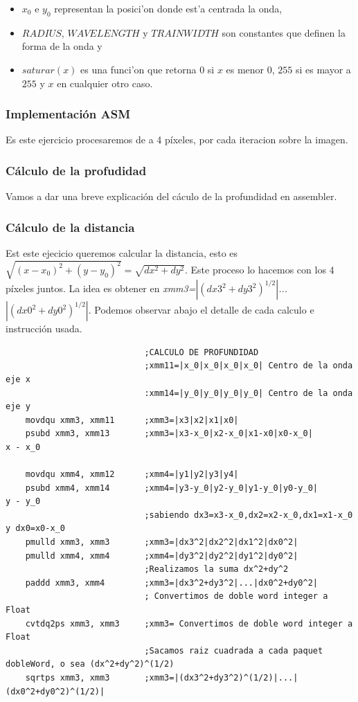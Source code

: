\begin{itemize}
  \item $x_0$ e $y_0$ representan la posici'on donde est'a centrada la onda,
  \item $RADIUS$, $WAVELENGTH$ y $TRAINWIDTH$ son constantes que definen la 
  forma de la onda y
  \item $saturar(x)$ es una funci'on que retorna $0$ si $x$ es menor $0$, $255$
  si es mayor a $255$ y $x$ en cualquier otro caso.
\end{itemize}

\newpage
\subsubsection{Implementación ASM}
Es este ejercicio procesaremos de a 4 píxeles, por cada iteracion sobre la imagen.
\subsubsection*{Cálculo de la profudidad}
Vamos a dar una breve explicación del cáculo de la profundidad en assembler.

\subsubsection*{Cálculo de la distancia}

Est este ejecicio queremos calcular la distancia, esto es $\sqrt{(x-x_0)^2+(y-y_0)^2} = \sqrt{dx^2+dy^2}$.
Este proceso lo hacemos con los 4 píxeles juntos.
La idea es obtener en \emph{xmm3=$|(dx3^2+dy3^2)^{1/2}|$...$|(dx0^2+dy0^2)^{1/2}|$}. Podemos observar abajo el detalle de cada calculo e instrucción usada.
\begin{codesnippet}
\begin{verbatim}
                            ;CALCULO DE PROFUNDIDAD
                            ;xmm11=|x_0|x_0|x_0|x_0| Centro de la onda eje x
                            :xmm14=|y_0|y_0|y_0|y_0| Centro de la onda eje y
    movdqu xmm3, xmm11      ;xmm3=|x3|x2|x1|x0| 
    psubd xmm3, xmm13       ;xmm3=|x3-x_0|x2-x_0|x1-x0|x0-x_0|                    x - x_0
							
    movdqu xmm4, xmm12      ;xmm4=|y1|y2|y3|y4|
    psubd xmm4, xmm14       ;xmm4=|y3-y_0|y2-y_0|y1-y_0|y0-y_0|                     y - y_0	
                            ;sabiendo dx3=x3-x_0,dx2=x2-x_0,dx1=x1-x_0 y dx0=x0-x_0
    pmulld xmm3, xmm3       ;xmm3=|dx3^2|dx2^2|dx1^2|dx0^2|
    pmulld xmm4, xmm4       ;xmm4=|dy3^2|dy2^2|dy1^2|dy0^2|
                            ;Realizamos la suma dx^2+dy^2
    paddd xmm3, xmm4        ;xmm3=|dx3^2+dy3^2|...|dx0^2+dy0^2|
                            ; Convertimos de doble word integer a Float
    cvtdq2ps xmm3, xmm3     ;xmm3= Convertimos de doble word integer a Float
                            ;Sacamos raiz cuadrada a cada paquet dobleWord, o sea (dx^2+dy^2)^(1/2)
    sqrtps xmm3, xmm3       ;xmm3=|(dx3^2+dy3^2)^(1/2)|...|(dx0^2+dy0^2)^(1/2)|
\end{verbatim}
\end{codesnippet}

